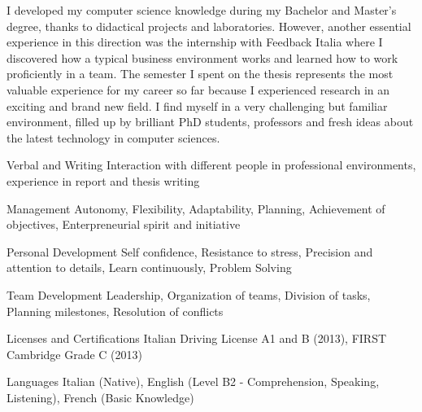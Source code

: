 {\begin{cvskills}
\end{cvskills}
\vspace{-5mm}
\begin{cvparagraph}
I developed my computer science knowledge during my Bachelor and Master's degree, thanks to didactical projects and laboratories.
However, another essential experience in this direction was the internship with Feedback Italia where I discovered how a typical business environment works and learned how to work proficiently in a team.
The semester I spent on the thesis represents the most valuable experience for my career so far because I experienced research in an exciting and brand new field.
I find myself in a very challenging but familiar environment, filled up by brilliant PhD students, professors and fresh ideas about the latest technology in computer sciences.
\end{cvparagraph}
\vspace{-3mm}
\begin{cvskills}

\cvskill
{Verbal and Writing} %
{Interaction with different people in professional environments, experience in report and thesis writing} %

\cvskill
{Management} %
{Autonomy, Flexibility, Adaptability, Planning, Achievement of objectives, Enterpreneurial spirit and initiative} %

\cvskill
{Personal Development} %
{Self confidence, Resistance to stress, Precision and attention to details, Learn continuously, Problem Solving} %

\cvskill
{Team Development} %
{Leadership, Organization of teams, Division of tasks, Planning milestones, Resolution of conflicts} %



\cvskill
{Licenses and Certifications} %
{Italian Driving License A1 and B (2013), FIRST Cambridge Grade C (2013)} %


\cvskill
{Languages} %
{Italian (Native), English (Level B2 - Comprehension, Speaking, Listening), French (Basic Knowledge)} %


\end{cvskills}}
